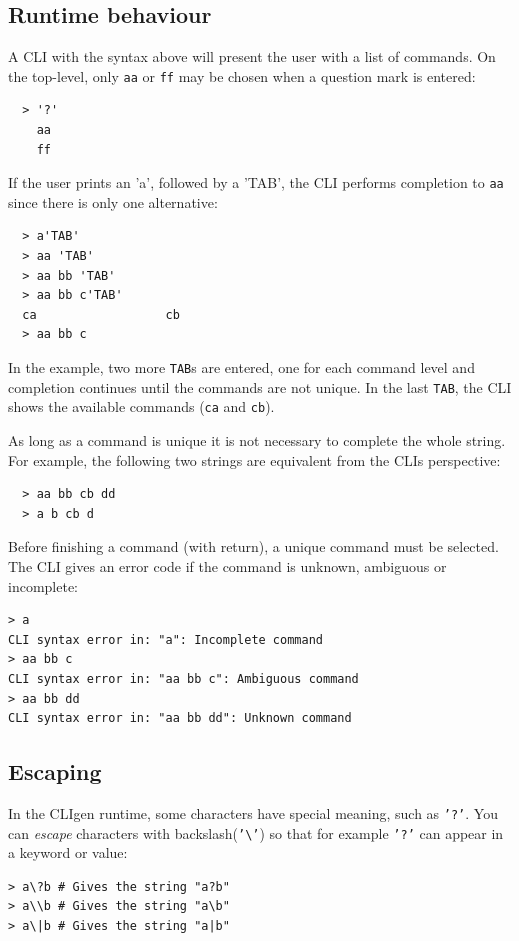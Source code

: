 \documentclass[a4paper, 10pt] {article}
\begin{document}
\subsection{Runtime behaviour}

A CLI with the syntax above will present the user with a list of
commands. On the top-level, only {\tt aa} or {\tt ff} may be chosen when a question mark is entered:
\begin{verbatim}
  > '?'
    aa
    ff
\end{verbatim}

If the user prints an 'a', followed by a 'TAB', the CLI performs
completion to {\tt aa} since there is only one alternative:
\begin{verbatim}
  > a'TAB'
  > aa 'TAB'
  > aa bb 'TAB'
  > aa bb c'TAB'
  ca                  cb
  > aa bb c
\end{verbatim}
In the example, two more {\tt TAB}s are entered, one for each command
level and completion continues until the commands are not unique. In
the last {\tt TAB}, the CLI shows the available commands ({\tt ca} and {\tt cb}).

As long as a command is unique it is not necessary to
complete the whole string. For example, the following two strings are
equivalent from the CLIs perspective:
\begin{verbatim}
  > aa bb cb dd
  > a b cb d
\end{verbatim}

Before finishing a command (with return), a unique
command must be selected. The CLI gives an error code if the command
is unknown, ambiguous or incomplete:
\begin{verbatim}
> a
CLI syntax error in: "a": Incomplete command
> aa bb c
CLI syntax error in: "aa bb c": Ambiguous command
> aa bb dd
CLI syntax error in: "aa bb dd": Unknown command
\end{verbatim}

\subsection{Escaping}

In the CLIgen runtime, some characters have special meaning, such as
{\tt '?'}. You can \emph{escape} characters with backslash({\tt '\textbackslash'}) so
that for example {\tt '?'} can appear in a keyword or value:
\begin{verbatim}
> a\?b # Gives the string "a?b"
> a\\b # Gives the string "a\b"
> a\|b # Gives the string "a|b"
\end{verbatim}
\end{document}
